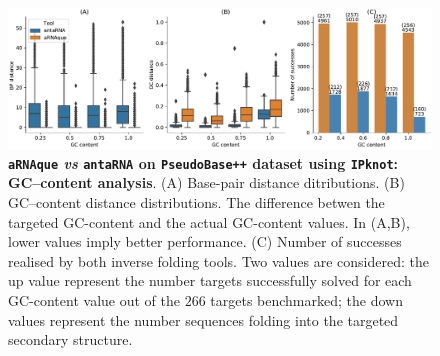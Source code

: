 \begin{figure}[t!]
	\includegraphics[width=1.0\linewidth]{../res/images/arnaque/GC_content.pdf}
	\caption{\textbf{\texttt{aRNAque} \emph{vs} \texttt{antaRNA} on \texttt{PseudoBase++} dataset using \texttt{IPknot}: GC--content analysis}. (A) Base-pair distance ditributions. (B) GC--content distance distributions. The difference betwen the targeted GC-content and the actual GC-content values. In (A,B), lower values imply better performance. (C) Number of successes realised by both inverse folding tools. Two values are considered: the up value represent the number targets successfully solved for each GC-content value out of the $266$ targets benchmarked; the down values represent the number sequences folding into the targeted secondary structure.}\label{Fig:GC_content}
\end{figure}
